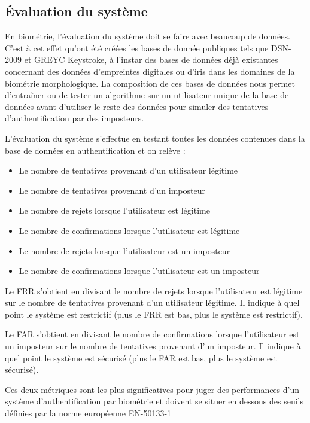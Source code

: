 \subsection{Évaluation du système}

En biométrie, l'évaluation du système doit se faire avec beaucoup de données. C'est à cet effet qu'ont été créées les bases de donnée publiques tels que DSN-2009\cite{killourhy2009} et GREYC Keystroke\cite{giotGREYC}, à l'instar des bases de données déjà existantes concernant des données d'empreintes digitales ou d'iris dans les domaines de la biométrie morphologique. La composition de ces bases de données nous permet d'entraîner ou de tester un algorithme sur un utilisateur unique de la base de données avant d'utiliser le reste des données pour simuler des tentatives d'authentification par des imposteurs.

L'évaluation du système s'effectue en testant toutes les données contenues dans la base de données en authentification et on relève :

\begin{itemize}
  \item Le nombre de tentatives provenant d'un utilisateur légitime
  \item Le nombre de tentatives provenant d'un imposteur
  \item Le nombre de rejets lorsque l'utilisateur est légitime
  \item Le nombre de confirmations lorsque l'utilisateur est légitime
  \item Le nombre de rejets lorsque l'utilisateur est un imposteur
  \item Le nombre de confirmations lorsque l'utilisateur est un imposteur
\end{itemize}

Le FRR s'obtient en divisant le nombre de rejets lorsque l'utilisateur est légitime sur le nombre de tentatives provenant d'un utilisateur légitime. Il indique à quel point le système est restrictif (plus le FRR est bas, plus le système est restrictif).

Le FAR s'obtient en divisant le nombre de confirmations lorsque l'utilisateur est un imposteur sur le nombre de tentatives provenant d'un imposteur. Il indique à quel point le système est sécurisé (plus le FAR est bas, plus le système est sécurisé).

Ces deux métriques sont les plus significatives pour juger des performances d'un système d'authentification par biométrie et doivent se situer en dessous des seuils définies par la norme européenne EN-50133-1
